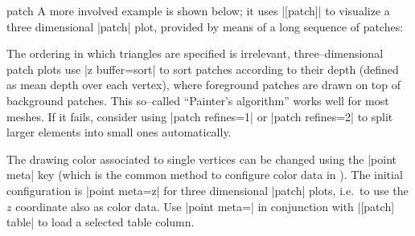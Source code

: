 {\begin{plottype}[/pgfplots]{patch}
	A more involved example is shown below; it uses |[patch]| to visualize a three dimensional |patch| plot, provided by means of a long sequence of patches:
\pgfplotsexpensiveexample
\begin{codeexample}[]
\end{codeexample}
	\noindent The ordering in which triangles are specified is irrelevant, three--dimensional patch plots use |z buffer=sort| to sort patches according to their depth (defined as mean depth over each vertex), where foreground patches are drawn on top of background patches. This so--called ``Painter's algorithm'' works well for most meshes. If it fails, consider using |patch refines=1| or |patch refines=2| to split larger elements into small ones automatically.


	The drawing color associated to single vertices can be changed using the |point meta| key (which is the common method to configure color data in \PGFPlots). The initial configuration is |point meta=z| for three dimensional |patch| plots, i.e.\ to use the $z$ coordinate also as color data. Use |point meta=\thisrow| in conjunction with |[patch] table| to load a selected table column.


\end{plottype}}
